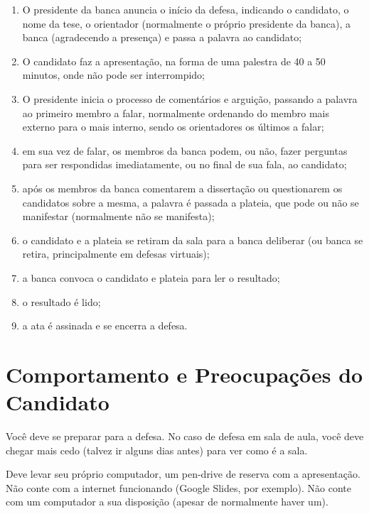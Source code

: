 \begin{enumerate}
    \item O presidente da banca anuncia o início da defesa, indicando o candidato, o nome da tese, o orientador (normalmente o próprio presidente da banca), a banca (agradecendo a presença) e passa a palavra ao candidato;
    \item O candidato faz a apresentação, na forma de uma palestra de 40 a 50 minutos, onde não pode ser interrompido;
    \item O presidente inicia o processo de comentários e arguição, passando a palavra ao primeiro membro a falar, normalmente ordenando do membro mais externo para o mais interno, sendo os orientadores os últimos a falar;
    \item em sua vez de falar, os membros da banca podem, ou não, fazer perguntas para ser respondidas imediatamente, ou no final de sua fala, ao candidato;
    \item após os membros da banca comentarem a dissertação ou questionarem os candidatos sobre a mesma, a palavra é passada a plateia, que pode ou não se manifestar (normalmente não se manifesta);
    \item o candidato e a plateia se retiram da sala para a banca deliberar (ou banca se retira, principalmente em defesas virtuais);
    \item a banca convoca o candidato e plateia para ler o resultado;
    \item o resultado é lido;
    \item a ata é assinada e se encerra a defesa.
\end{enumerate}

\section{Comportamento e Preocupações do Candidato}

Você deve se preparar para a defesa. No caso de defesa em sala de aula, você deve chegar mais cedo (talvez ir alguns dias antes) para ver como é a sala. 

Deve levar seu próprio computador, um pen-drive de reserva com a apresentação. Não conte com a internet funcionando (Google Slides, por exemplo). Não conte com um computador a sua disposição (apesar de normalmente haver um). 


